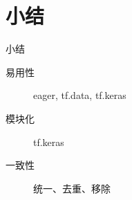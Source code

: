 
\section{小结}

\begin{frame}{小结}
    \begin{description}
        \item[易用性] eager, tf.data, tf.keras
        \item[模块化] tf.keras
        \item[一致性] 统一、去重、移除
    \end{description}
\end{frame}
